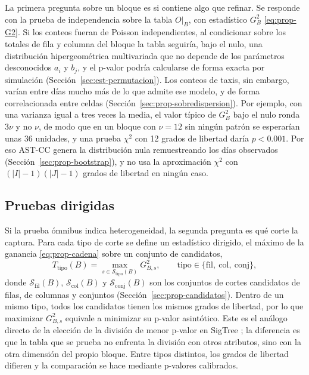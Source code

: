 La primera pregunta sobre un bloque es si contiene algo que refinar. Se
responde con la prueba de independencia sobre la tabla $O|_B$, con estadístico
$G^2_B$ \eqref{eq:prop-G2}. Si los conteos fueran de Poisson independientes, al
condicionar sobre los totales de fila y columna del bloque la tabla seguiría,
bajo el nulo, una distribución hipergeométrica multivariada que no depende de
los parámetros desconocidos $a_i$ y $b_j$, y el p-valor podría calcularse de
forma exacta por simulación (Sección~\ref{sec:est-permutacion}). Los conteos de
taxis, sin embargo, varían entre días mucho más de lo que admite ese modelo, y
de forma correlacionada entre celdas (Sección~\ref{sec:prop-sobredispersion}).
Por ejemplo, con una varianza igual a tres veces la media, el valor típico de
$G^2_B$ bajo el nulo ronda $3\nu$ y no $\nu$, de modo que en un bloque con
$\nu=12$ sin ningún patrón se esperarían unas 36 unidades, y una prueba $\chi^2$
con 12 grados de libertad daría $p<0.001$. Por eso AST-CC genera la distribución
nula remuestreando los días observados (Sección~\ref{sec:prop-bootstrap}), y no usa
la aproximación $\chi^2$ con $(|I|-1)(|J|-1)$ grados de libertad en ningún caso.

\subsection{Pruebas dirigidas}

Si la prueba ómnibus indica heterogeneidad, la segunda pregunta es qué corte la
captura. Para cada tipo de corte se define un estadístico dirigido, el máximo de
la ganancia \eqref{eq:prop-cadena} sobre un conjunto de candidatos,
\begin{equation}\label{eq:prop-dirigidos}
  T_{\mathrm{tipo}}(B) = \max_{s\in\mathcal{S}_{\mathrm{tipo}}(B)} G^2_{B,s},
  \qquad \mathrm{tipo}\in\{\mathrm{fil},\ \mathrm{col},\ \mathrm{conj}\},
\end{equation}
donde $\mathcal{S}_{\mathrm{fil}}(B)$, $\mathcal{S}_{\mathrm{col}}(B)$ y
$\mathcal{S}_{\mathrm{conj}}(B)$ son los conjuntos de cortes candidatos de filas,
de columnas y conjuntos (Sección~\ref{sec:prop-candidatos}).
Dentro de un mismo tipo, todos los candidatos tienen los mismos grados de
libertad, por lo que maximizar $G^2_{B,s}$ equivale a minimizar su p-valor
asintótico. Este es el análogo directo de la elección de la división de menor
p-valor en SigTree \cite{Hu2025}; la diferencia es que la tabla que se prueba
no enfrenta la división con otros atributos, sino con la otra dimensión del
propio bloque. Entre tipos distintos, los grados de libertad difieren y la
comparación se hace mediante p-valores calibrados.

